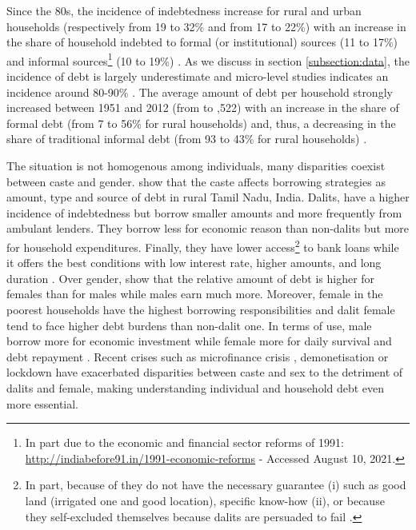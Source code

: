 \documentclass[a4paper, 11pt, onecolumn]{article}
\begin{document}
Since the 80s, the incidence of indebtedness increase for rural and urban households (respectively from 19 to 32\% and from 17 to 22\%) with an increase in the share of household indebted to formal (or institutional) sources (11 to 17\%) and informal sources\footnote{In part due to the economic and financial sector reforms of 1991: \url{http://indiabefore91.in/1991-economic-reforms} - Accessed August 10, 2021.} (10 to 19\%) \citep{Rajakumar2019}.
As we discuss in section \ref{subsection:data}, the incidence of debt is largely underestimate \citep{Jones1994} and micro-level studies indicates an incidence around 80-90\% \citep{Guerin2013a, Jones1994, Dreze1997, Reboul2021}.
The average amount of debt per household strongly increased between 1951 and 2012 (from  to ,522) with an increase in the share of formal debt (from 7 to 56\% for rural households) and, thus, a decreasing in the share of traditional informal debt (from 93 to 43\% for rural households) \citep{Rajakumar2019}.

The situation is not homogenous among individuals, many disparities coexist between caste and gender.
\cite{Guerin2013a} show that the caste affects borrowing strategies as amount, type and source of debt in rural Tamil Nadu, India.
Dalits, have a higher incidence of indebtedness but borrow smaller amounts and more frequently from ambulant lenders.
They borrow less for economic reason than non-dalits but more for household expenditures. %
Finally, they have lower access\footnote{In part, because of they do not have the necessary guarantee (i) such as good land (irrigated one and good location), specific know-how (ii), or because they self-excluded themselves because dalits are persuaded to fail \citep{Guerin2013a}.} to bank loans while it offers the best conditions with low interest rate, higher amounts, and long duration \citep{Chavan2007}.
Over gender, \cite{Reboul2021} show that the relative amount of debt is higher for females than for males while males earn much more.
Moreover, female in the poorest households have the highest borrowing responsibilities and dalit female tend to face higher debt burdens than non-dalit one.
In terms of use, male borrow more for economic investment while female more for daily survival and debt repayment \citep{Reboul2021}.
Recent crises such as microfinance crisis \citep{Nair2011, Sriram2010}, demonetisation \citep{GuerinDemo2017} or lockdown \citep{Guerin2021, Guerin2021b} have exacerbated disparities between caste and sex to the detriment of dalits and female, making understanding individual and household debt even more essential.
\end{document}
